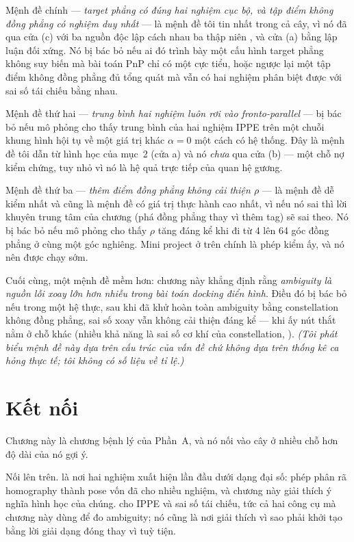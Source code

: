 \documentclass[../../marker.tex]{subfiles}
\begin{document}
Mệnh đề chính --- \emph{target phẳng có đúng hai nghiệm cục bộ, và tập điểm không đồng phẳng có nghiệm duy nhất} --- là mệnh đề tôi tin nhất trong cả cây, vì nó đã qua cửa (c) với ba nguồn độc lập cách nhau ba thập niên \cite{oberkampf1996iterative,schweighofer2006robust,collins2014ippe}, và cửa (a) bằng lập luận đối xứng. Nó bị bác bỏ nếu ai đó trình bày một cấu hình target phẳng không suy biến mà bài toán PnP chỉ có một cực tiểu, hoặc ngược lại một tập điểm không đồng phẳng đủ tổng quát mà vẫn có hai nghiệm phân biệt được với sai số tái chiếu bằng nhau.

Mệnh đề thứ hai --- \emph{trung bình hai nghiệm luôn rơi vào fronto-parallel} --- bị bác bỏ nếu mô phỏng cho thấy trung bình của hai nghiệm IPPE trên một chuỗi khung hình hội tụ về một giá trị khác \(\alpha = 0\) một cách có hệ thống. Đây là mệnh đề tôi dẫn từ hình học của mục~2 (cửa a) và nó \emph{chưa} qua cửa (b) --- một chỗ nợ kiểm chứng, tuy nhỏ vì nó là hệ quả trực tiếp của quan hệ gương.

Mệnh đề thứ ba --- \emph{thêm điểm đồng phẳng không cải thiện \(\rho\)} --- là mệnh đề dễ kiểm nhất và cũng là mệnh đề có giá trị thực hành cao nhất, vì nếu nó sai thì lời khuyên trung tâm của chương (phá đồng phẳng thay vì thêm tag) sẽ sai theo. Nó bị bác bỏ nếu mô phỏng cho thấy \(\rho\) tăng đáng kể khi đi từ 4 lên 64 góc đồng phẳng ở cùng một góc nghiêng. Mini project ở trên chính là phép kiểm ấy, và nó nên được chạy sớm.

Cuối cùng, một mệnh đề mềm hơn: chương này khẳng định rằng \emph{ambiguity là nguồn lỗi xoay lớn hơn nhiễu trong bài toán docking điển hình}. Điều đó bị bác bỏ nếu trong một hệ thực, sau khi đã khử hoàn toàn ambiguity bằng constellation không đồng phẳng, sai số xoay vẫn không cải thiện đáng kể --- khi ấy nút thắt nằm ở chỗ khác (nhiều khả năng là sai số cơ khí của constellation, ). \emph{(Tôi phát biểu mệnh đề này dựa trên cấu trúc của vấn đề chứ không dựa trên thống kê ca hỏng thực tế; tôi không có số liệu về tỉ lệ.)}

\section{Kết nối}

Chương này là chương bệnh lý của Phần~A, và nó nối vào cây ở nhiều chỗ hơn độ dài của nó gợi ý.

Nối lên trên.  là nơi hai nghiệm xuất hiện lần đầu dưới dạng đại số: phép phân rã homography thành pose vốn đã cho nhiều nghiệm, và chương này giải thích ý nghĩa hình học của chúng.  cho IPPE và sai số tái chiếu, tức cả hai công cụ mà chương này dùng để đo ambiguity; nó cũng là nơi giải thích vì sao phải khởi tạo bằng lời giải dạng đóng thay vì tuỳ tiện.
\end{document}
